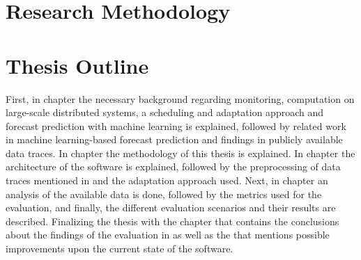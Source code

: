         \section{Research Methodology}
        \label{sec:research-methodology-introduction}

        

        
        \section{Thesis Outline}
        \label{sec:thesis-outline-introduction}

            First, in chapter  the necessary background regarding monitoring, computation on large-scale distributed systems, a scheduling and adaptation approach and forecast prediction with machine learning is explained, followed by related work in machine learning-based forecast prediction and findings in publicly available data traces.
            In chapter  the methodology of this thesis is explained. 
            In chapter  the architecture of the software is explained, followed by the preprocessing of data traces mentioned in  and the adaptation approach used.
            Next, in chapter  an analysis of the available data is done, followed by the metrics used for the evaluation, and finally, the different evaluation scenarios and their results are described.
            Finalizing the thesis with the chapter  that contains the conclusions about the findings of the evaluation in  as well as the  that mentions possible improvements upon the current state of the software.


